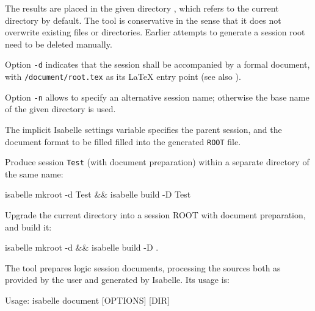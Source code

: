 \begin{isabellebody}
\begin{isamarkuptext}
  The results are placed in the given directory , which
  refers to the current directory by default.  The \hyperlink{tool.mkroot}{\mbox{}} tool
  is conservative in the sense that it does not overwrite existing
  files or directories.  Earlier attempts to generate a session root
  need to be deleted manually.

  \medskip Option \verb|-d| indicates that the session shall be
  accompanied by a formal document, with \verb|/document/root.tex| as its {\LaTeX} entry point (see also
  ).

  Option \verb|-n| allows to specify an alternative session
  name; otherwise the base name of the given directory is used.

  \medskip The implicit Isabelle settings variable \hyperlink{setting.ISABELLE-LOGIC}{\mbox{}} specifies the parent session, and \hyperlink{setting.ISABELLE-DOCUMENT-FORMAT}{\mbox{}} the document format to be filled filled
  into the generated \verb|ROOT| file.%
\end{isamarkuptext}%
\isamarkuptrue%
%
\isamarkuptrue%
%
\begin{isamarkuptext}%
Produce session \verb|Test| (with document preparation)
  within a separate directory of the same name:
\begin{ttbox}
isabelle mkroot -d Test && isabelle build -D Test
\end{ttbox}

  \medskip Upgrade the current directory into a session ROOT with
  document preparation, and build it:
\begin{ttbox}
isabelle mkroot -d && isabelle build -D .
\end{ttbox}%
\end{isamarkuptext}%
\isamarkuptrue%
%
\isamarkuptrue%
%
\begin{isamarkuptext}%
The \hypertarget{tool.document}{\hyperlink{tool.document}{\mbox{}}} tool prepares logic session
  documents, processing the sources both as provided by the user and
  generated by Isabelle.  Its usage is:
\begin{ttbox}
Usage: isabelle document [OPTIONS] [DIR]


\end{ttbox}
\end{isamarkuptext}
\end{isabellebody}
